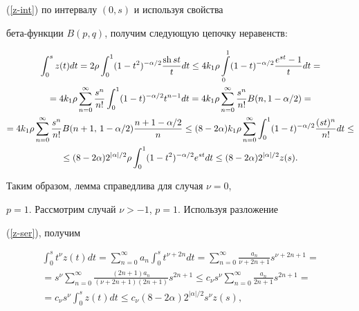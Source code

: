 (\ref{z-int}) по интервалу $(0,s)$ и используя свойства


бета-функции $B(p,q)$, получим следующую цепочку неравенств:


\begin{multline*}


\int_0^s z(t) d t =2\rho\int_0^1 (1-t^2)^{-\alpha/2}


\frac{\sh s t}{t} d t \le 4 k_1 \rho\int\limits_0^1


(1-t)^{-\alpha/2}\frac{e^{st}-1}{t}d t =\\


%


=4 k_1 \rho \sum_{n=0}^\infty \frac{s^n}{n!}


\int_0^1 (1-t)^{-\alpha/2}t^{n-1} d t


= 4 k_1 \rho \sum\limits_{n=0}^\infty


\frac{s^n}{n!}B(n,1-\alpha/2)=\\


%


=4 k_1 \rho \sum\limits_{n=0}^\infty \frac{s^n}{n!}B(n+1,\,1-\alpha/2)


\frac{n+1-\alpha/2}{n}


\le (8-2\alpha)k_1 \rho \sum\limits_{n=0}^\infty


\int_0^1 (1-t)^{-\alpha/2} \frac{(st)^n}{n!} d t \le \\


%


\le(8-2\alpha)2^{|\alpha|/2}\rho \int_0^1 (1-t^2)^{-\alpha/2}e^{st}d t


\le (8-2\alpha)2^{|\alpha|/2}z(s).


\end{multline*}


Таким образом, лемма справедлива для случая $\nu=0$,


$p=1$. Рассмотрим случай $\nu > -1$, $p=1$. Используя разложение


(\ref{z-ser}), получим


\begin{multline*}


\int_0^s t^\nu z(t) d t =\sum\limits_{n=0}^\infty a_n


\int_0^s t^{\nu+2n} d t =


\sum_{n=0}^\infty \frac{a_n}{\nu+2n+1} s^{\nu+2n+1}=\\


%


= s^\nu \sum_{n=0}^\infty \frac{(2n+1)a_n}{(\nu+2n+1)(2n+1)}s^{2n+1}


\le c_\nu s^\nu\sum_{n=0}^\infty \frac{a_n}{2n+1}


s^{2n+1}=\\


=c_\nu s^\nu \int_0^s z(t)d t \le c_\nu (8-2\alpha)2^{|\alpha|/2}s^\nu z(s),


\end{multline*}


